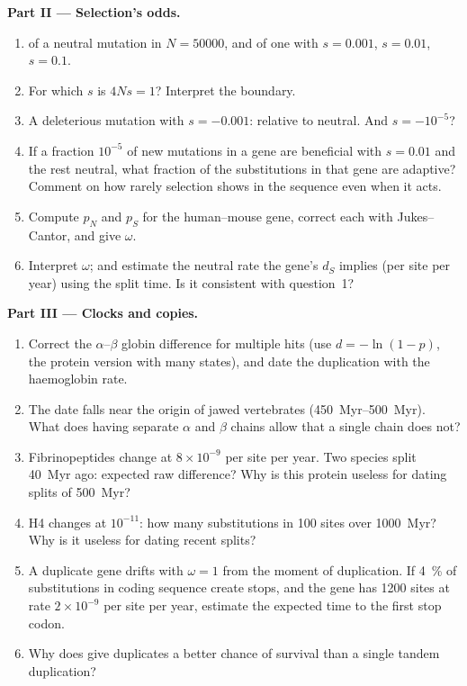 \begin{problem}
\medskip
\noindent\textbf{Part II --- Selection's odds.}
\begin{enumerate}[resume]
  \item {} of a neutral mutation in $N = \num{50000}$,
        and of one with $s = 0.001$, $s = 0.01$, $s = 0.1$.
  \item For which $s$ is $4Ns = 1$? Interpret the boundary.
  \item A deleterious mutation with $s = -0.001$: 
        relative to neutral. And $s = -10^{-5}$?
  \item If a fraction $10^{-5}$ of new mutations in a gene are
        beneficial with $s = 0.01$ and the rest neutral, what fraction of
        the substitutions in that gene are adaptive? Comment on how
        rarely selection shows in the sequence even when it acts.
  \item Compute $p_{N}$ and $p_{S}$ for the human--mouse gene, correct
        each with Jukes--Cantor, and give $\omega$.
  \item Interpret $\omega$; and estimate the neutral rate the gene's
        $d_{S}$ implies (per site per year) using the split time. Is it
        consistent with question~1?
\end{enumerate}

\medskip
\noindent\textbf{Part III --- Clocks and copies.}
\begin{enumerate}[resume]
  \item Correct the $\alpha$--$\beta$ globin difference for multiple
        hits (use $d = -\ln(1 - p)$, the protein version with many
        states), and date the duplication with the haemoglobin rate.
  \item The date falls near the origin of jawed vertebrates
        (\qtyrange{450}{500}{Myr}). What does having separate $\alpha$
        and $\beta$ chains allow that a single chain does not?
  \item Fibrinopeptides change at $8\times 10^{-9}$ per site per year.
        Two species split \qty{40}{Myr} ago: expected raw difference?
        Why is this protein useless for dating splits of
        \qty{500}{Myr}?
  \item {} H4 changes at $10^{-11}$: how many substitutions in 100
        sites over \qty{1000}{Myr}? Why is it useless for dating recent
        splits?
  \item A duplicate gene drifts with $\omega = 1$ from the moment of
        duplication. If \qty{4}{\%} of substitutions in coding sequence
        create stops, and the gene has 1200 sites at rate $2\times
        10^{-9}$ per site per year, estimate the expected time to the
        first stop codon.
  \item Why does  give duplicates a better
        chance of survival than a single tandem duplication?
\end{enumerate}


\end{problem}
